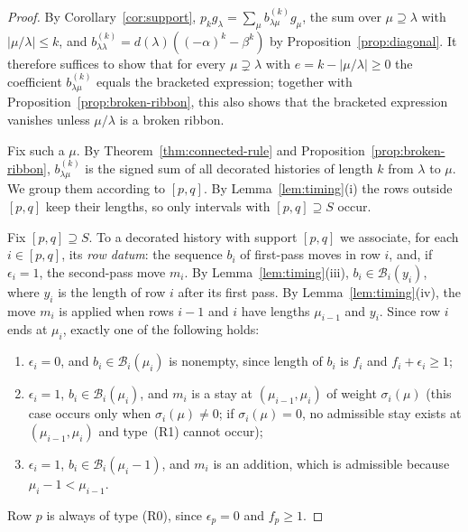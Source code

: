 \documentclass[11pt]{amsart}
\numberwithin{equation}{section}
\theoremstyle{definition}
\theoremstyle{remark}
\newcommand{\cB}{\mathcal B}
\begin{document}
\begin{proof}
By Corollary~\ref{cor:support},
$p_kg_\lambda=\sum_\mu b^{(k)}_{\lambda\mu}g_\mu$, the sum over
$\mu\supseteq\lambda$ with $|\mu/\lambda|\leq k$, and
$b^{(k)}_{\lambda\lambda}=d(\lambda)((-\alpha)^k-\beta^k)$ by
Proposition~\ref{prop:diagonal}. It therefore suffices to show that for
every $\mu\supsetneq\lambda$ with $e=k-|\mu/\lambda|\geq0$ the coefficient
$b^{(k)}_{\lambda\mu}$ equals the bracketed expression; together with
Proposition~\ref{prop:broken-ribbon}, this also shows that the bracketed
expression vanishes unless $\mu/\lambda$ is a broken ribbon.

Fix such a $\mu$. By Theorem~\ref{thm:connected-rule} and
Proposition~\ref{prop:broken-ribbon}, $b^{(k)}_{\lambda\mu}$ is the signed sum
of all decorated histories of length $k$ from $\lambda$ to $\mu$. We group
them according to $[p,q]$. By
Lemma~\ref{lem:timing}(i) the rows outside $[p,q]$ keep their lengths, so
only intervals with $[p,q]\supseteq S$ occur.

Fix $[p,q]\supseteq S$. To a decorated history with support $[p,q]$ we
associate, for each $i\in[p,q]$, its \emph{row datum}: the sequence $b_i$
of first-pass moves in row $i$, and, if $\epsilon_i=1$, the second-pass
move $m_i$. By Lemma~\ref{lem:timing}(iii), $b_i\in\cB_i(y_i)$, where $y_i$ is
the length of row $i$ after its first pass. By Lemma~\ref{lem:timing}(iv),
the move $m_i$ is applied when rows $i-1$ and $i$ have lengths $\mu_{i-1}$ and
$y_i$. Since row $i$ ends at $\mu_i$, exactly one of the following holds:
\begin{enumerate}[label=(R\arabic*),start=0]
\item $\epsilon_i=0$, and $b_i\in\cB_i(\mu_i)$ is nonempty, since length of $b_i$ is $f_i$ and $f_i+\epsilon_i \geq 1$;
\item $\epsilon_i=1$, $b_i\in\cB_i(\mu_i)$, and $m_i$ is a stay at
$(\mu_{i-1},\mu_i)$ of weight $\sigma_i(\mu)$ (this case occurs only when
$\sigma_i(\mu)\neq0$; if $\sigma_i(\mu)=0$, no admissible stay exists at
$(\mu_{i-1},\mu_i)$ and type~\textup{(R1)} cannot occur);
\item $\epsilon_i=1$, $b_i\in\cB_i(\mu_i-1)$, and $m_i$ is an addition, which
is admissible because $\mu_i-1<\mu_{i-1}$.
\end{enumerate}
Row $p$ is always of type (R0), since $\epsilon_p=0$ and $f_p\geq1$.


\end{proof}
\end{document}
